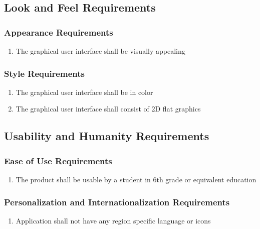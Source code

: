\documentclass[]{article}
\begin{document}
\subsection{Look and Feel Requirements}
\label{sub:look_and_feel_requirements}

\subsubsection{Appearance Requirements}
\label{ssub:appearance_requirements}
\begin{enumerate}[{LF}1. ]
	\item The graphical user interface shall be visually appealing
\end{enumerate}

\subsubsection{Style Requirements}
\label{ssub:style_requirements}
\begin{enumerate}[{LF}1. ]
	\item The graphical user interface shall be in color
	\item The graphical user interface shall consist of 2D flat graphics
\end{enumerate}


\subsection{Usability and Humanity Requirements}
\label{sub:usability_and_humanity_requirements}

\subsubsection{Ease of Use Requirements}
\label{ssub:ease_of_use_requirements}
\begin{enumerate}[{UH}1. ]
	\item The product shall be usable by a student in 6th grade or equivalent education
\end{enumerate}

\subsubsection{Personalization and Internationalization Requirements}
\label{ssub:personalization_and_internationalization_requirements}
\begin{enumerate}[{UH}1. ]
	\item Application shall not have any region specific language or icons
\end{enumerate}
\end{document}
